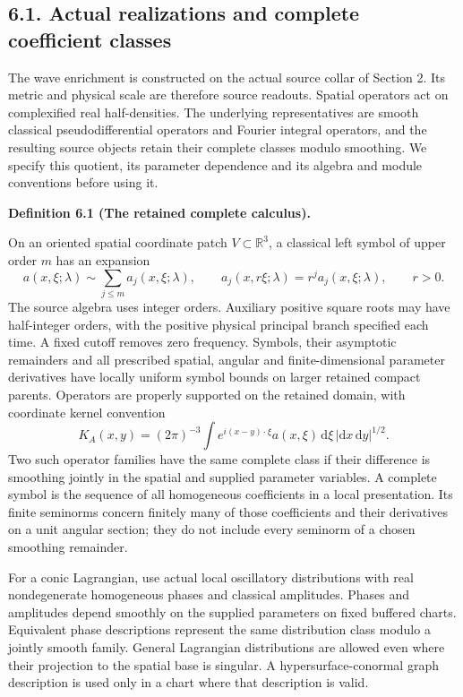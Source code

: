 \documentclass[
  english,
  11pt,
  reqno]{amsart}
\makeatletter
\newcommand{\pandocstatementheading}[1]{%
  \par\if@nobreak\else
    \addpenalty{\@beginparpenalty}%
    \addvspace{.5\baselineskip plus .2\baselineskip minus .2\baselineskip}%
  \fi
  {\normalfont\bfseries #1\par}%
  \nobreak\@afterindenttrue\@afterheading
}
\makeatother
\begin{document}
\subsection{6.1. Actual realizations and complete coefficient
classes}\label{actual-realizations-and-complete-coefficient-classes}\label{sec:online-complete-wave-calculus}

The wave enrichment is constructed on the actual source collar of
Section 2. Its metric and physical scale are therefore source readouts.
Spatial operators act on complexified real half-densities. The
underlying representatives are smooth classical pseudodifferential
operators and Fourier integral operators, and the resulting source
objects retain their complete classes modulo smoothing. We specify this
quotient, its parameter dependence and its algebra and module
conventions before using it.

\pandocstatementheading{\leavevmode{}\label{def:online-complete-symbol-calculus}Definition 6.1 (The retained complete calculus).}

On an oriented spatial coordinate patch \(V\subset\mathbb R^3\), a
classical left symbol of upper order \(m\) has an expansion%
 \[
a(x,\xi;\lambda)\sim\sum_{j\le m}a_j(x,\xi;\lambda),
\qquad a_j(x,r\xi;\lambda)=r^j a_j(x,\xi;\lambda),
\qquad r>0.
\] The source algebra uses integer orders. Auxiliary positive square
roots may have half-integer orders, with the positive physical principal
branch specified each time. A fixed cutoff removes zero frequency.
Symbols, their asymptotic remainders and all prescribed spatial, angular
and finite-dimensional parameter derivatives have locally uniform symbol
bounds on larger retained compact parents. Operators are properly
supported on the retained domain, with coordinate kernel convention%
 \[
K_A(x,y)=(2\pi)^{-3}
\int e^{i(x-y)\cdot\xi}a(x,\xi)\,\mathrm d\xi
\,|\mathrm dx\,\mathrm dy|^{1/2}.
\] Two such operator families have the same complete class if their
difference is smoothing jointly in the spatial and supplied parameter
variables. A complete symbol is the sequence of all homogeneous
coefficients in a local presentation. Its finite seminorms concern
finitely many of those coefficients and their derivatives on a unit
angular section; they do not include every seminorm of a chosen
smoothing remainder.

For a conic Lagrangian, use actual local oscillatory distributions with
real nondegenerate homogeneous phases and classical amplitudes. Phases
and amplitudes depend smoothly on the supplied parameters on fixed
buffered charts. Equivalent phase descriptions represent the same
distribution class modulo a jointly smooth family. General Lagrangian
distributions are allowed even where their projection to the spatial
base is singular. A hypersurface-conormal graph description is used only
in a chart where that description is valid.
\end{document}

